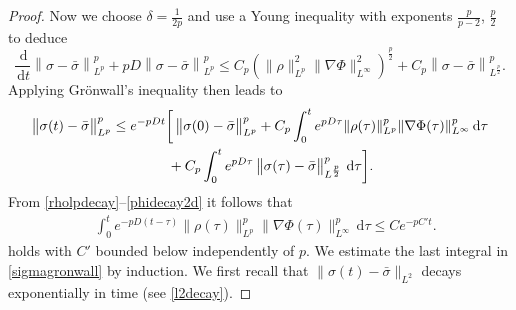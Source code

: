 \documentclass[10pt,twoside,reqno]{amsart}
\numberwithin{figure}{section}
\numberwithin{equation}{section}
\theoremstyle{definition}
\def\bas#1#2\eas{\begin{align}\label{#1}\begin{split}#2\end{split}\end{align}}
\newcommand{\1}{\mathbbm{1}}
\newcommand{\diff}{\,\mathrm{d}}
\newcommand{\be}{\begin{equation}}
\newcommand{\ee}{\end{equation}}
\newcommand{\la}{\label}
\newcommand{\fr}{\frac}
\begin{document}
\begin{proof}
Now we choose $\delta =\fr{1}{2p}$ and use a Young inequality with exponents
$\fr{p}{p-2}$, $\fr{p}{2}$ to deduce
\be
\frac{\diff}{\diff{t}} \left\|\sigma - \bar{\sigma}\right\|_{L^p}^p + pD \left\|\sigma - \bar{\sigma}\right\|_{L^p}^p \leq C_p\left ( \|\rho\|_{L^p}^2 \|\nabla \Phi\|_{L^\infty}^2\right)^{\fr{p}{2}} + C_p\left\|\sigma - \bar{\sigma}\right\|_{L^\frac{p}{2}}^p.
\la{normdiffe}
\ee
Applying Gr\"{o}nwall's inequality then leads to
\begin{align}
\left\|\sigma(t) - \bar{\sigma}\right\|_{L^p}^p
 &\leq e^{- pD t} \bigg[\left\|\sigma(0) - \bar{\sigma}\right\|_{L^p}^p
 + C_p\int_0^t e^{pD \tau} \|\rho(\tau)\|_{L^p}^p \|\nabla \Phi(\tau)\|_{L^\infty}^p \diff{\tau}\notag\\
 &\quad\quad\quad\quad
 + C_p\int_0^t e^{pD \tau} \left\|\sigma(\tau) - \bar{\sigma}\right\|_{L^{\frac{p}{2}}}^p \diff{\tau}\bigg].
\label{sigmagronwall}
\end{align}
From \eqref{rholpdecay}--\eqref{phidecay2d} it follows that
\begin{align*}
&  \int_0^t e^{-pD (t-\tau)} \|\rho(\tau)\|_{L^p}^p \|\nabla \Phi(\tau)\|_{L^\infty}^p \diff{\tau}
\leq C e^{- pC' t}.
\end{align*}
holds with $C'$ bounded below independently of $p$.
We estimate the last integral in \eqref{sigmagronwall} by induction. We first recall that $\|\sigma(t) - \bar{\sigma}\|_{L^2}$ decays exponentially in time (see \eqref{l2decay}).


\end{proof}
\end{document}
